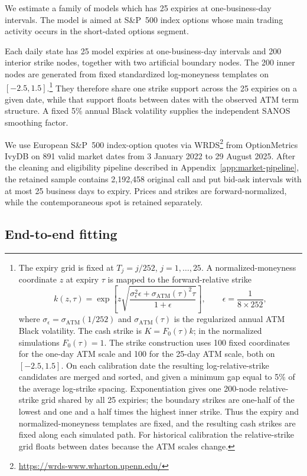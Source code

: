 \documentclass[11pt]{article}
\theoremstyle{plain}
\theoremstyle{definition}
\theoremstyle{remark}
\begin{document}
We estimate a family of models which has 25 expiries at one-business-day intervals. The model is aimed at S\&P~500 index options
whose main trading activity occurs in the short-dated options segment.

Each daily state has 25 model expiries at one-business-day intervals and 200
interior strike nodes, together with two artificial boundary nodes. The 200
inner nodes are generated from fixed standardized log-moneyness templates on
$[-2.5,1.5]$.\footnote{The expiry grid is fixed at $T_j=j/252$,
$j=1,\ldots,25$.  A normalized-moneyness coordinate $z$ at expiry $\tau$ is
mapped to the forward-relative strike
\[
  k(z,\tau)=\exp\!\left[z\sqrt{
    \frac{\sigma_{\epsilon}^2\epsilon+
    \sigma_{\mathrm{ATM}}(\tau)^2\tau}{1+\epsilon}}
  \right],
  \qquad \epsilon=\frac{1}{8\times252},
\]
where $\sigma_{\epsilon}=\sigma_{\mathrm{ATM}}(1/252)$ and
$\sigma_{\mathrm{ATM}}(\tau)$ is the regularized annual ATM Black volatility.
The cash strike is $K=F_0(\tau)k$; in the normalized simulations $F_0(\tau)=1$.
The strike construction uses 100 fixed coordinates for the one-day ATM scale
and 100 for the 25-day ATM scale, both on $[-2.5,1.5]$.  On each calibration
date the resulting log-relative-strike candidates are merged and sorted, and
given a minimum gap equal to 5\% of the average log-strike spacing.
Exponentiation gives one 200-node relative-strike grid shared by all 25
expiries; the boundary strikes are one-half of the lowest and one and a half
times the highest inner strike.  Thus the expiry and normalized-moneyness
templates are fixed, and the resulting cash strikes are fixed along each
simulated path.  For historical calibration the relative-strike grid floats
between dates because the ATM scales change.}
They therefore share one strike support across the 25 expiries on a given
date, while that support floats between dates with the observed ATM term
structure. A fixed 5\% annual Black volatility supplies the independent SANOS
smoothing factor.

We use European S\&P~500 index-option quotes via WRDS\footnote{\url{https://wrds-www.wharton.upenn.edu/}} from OptionMetrics IvyDB
on 891 valid market dates from 3 January 2022 to 29 August 2025.
After the cleaning and eligibility pipeline described in
Appendix~\ref{app:market-pipeline}, the retained sample contains 2,192,458
original call and put bid-ask intervals with at most 25 business days to
expiry. Prices and strikes are forward-normalized, while the contemporaneous
spot is retained separately.


\subsection{End-to-end fitting}
\label{sec:estimation-fit}
\end{document}
